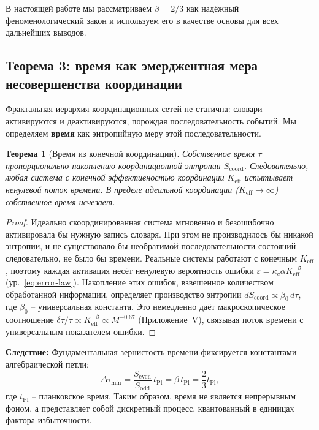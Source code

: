 \documentclass[11pt,a4paper]{article}
\newtheorem{theorem}{Теорема}[section]
\begin{document}
	В настоящей работе мы рассматриваем \(\beta = 2/3\) как надёжный феноменологический закон и используем его в качестве основы для всех дальнейших выводов.
	
	\subsection{Теорема 3: время как эмерджентная мера несовершенства координации}
	\label{subsec:time-emergence}
	
	Фрактальная иерархия координационных сетей не статична: словари активируются и деактивируются, порождая последовательность событий.  Мы определяем
	\textbf{время} как энтропийную меру этой последовательности.
	
	\begin{theorem}[Время из конечной координации]
		\label{thm:time}
		Собственное время \(\tau\) пропорционально накоплению координационной энтропии \(S_{\mathrm{coord}}\).  Следовательно, любая система с конечной эффективностью координации \(K_{\mathrm{eff}}\) испытывает ненулевой поток времени.  В пределе идеальной координации (\(K_{\mathrm{eff}} \to \infty\)) собственное время исчезает.
	\end{theorem}
	
	\begin{proof}
		Идеально скоординированная система мгновенно и безошибочно активировала бы нужную запись словаря.  При этом не производилось бы никакой энтропии, и не существовало бы необратимой последовательности состояний – следовательно, не было бы времени.  Реальные системы работают с конечным \(K_{\mathrm{eff}}\), поэтому каждая активация несёт ненулевую вероятность ошибки \(\varepsilon = \kappa_c \alpha K_{\mathrm{eff}}^{-\beta}\) (ур.~\ref{eq:error-law}).  Накопление этих ошибок, взвешенное количеством обработанной информации, определяет производство энтропии \(dS_{\mathrm{coord}} \propto \beta_0 \, d\tau\), где \(\beta_0\) – универсальная константа.  Это немедленно даёт макроскопическое соотношение \(\delta\tau/\tau \propto K_{\mathrm{eff}}^{-\beta} \propto M^{-0.67}\) (Приложение~V), связывая поток времени с универсальным показателем ошибки.
	\end{proof}
	
	\noindent
	\textbf{Следствие:} Фундаментальная зернистость времени фиксируется константами алгебраической петли:
	\[
	\Delta \tau_{\min} = \frac{S_{\mathrm{even}}}{S_{\mathrm{odd}}} \, t_{\mathrm{Pl}}
	= \beta \, t_{\mathrm{Pl}} = \frac{2}{3} t_{\mathrm{Pl}},
	\]
	где \(t_{\mathrm{Pl}}\) – планковское время.  Таким образом, время не является непрерывным фоном, а представляет собой дискретный процесс, квантованный в единицах фактора избыточности.
	
\end{document}

